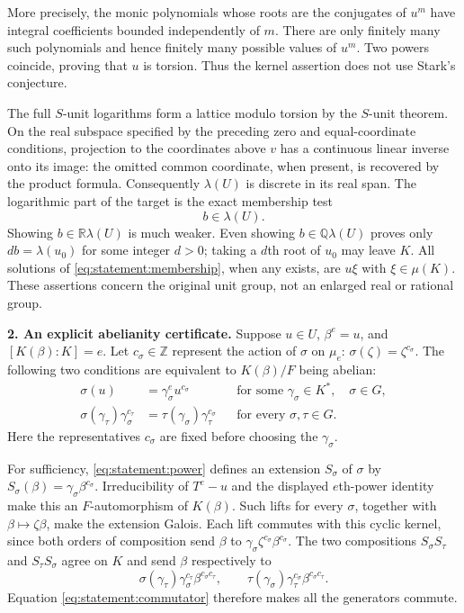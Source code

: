\documentclass[11pt,a4paper]{article}
\newcommand{\Z}{\mathbb{Z}}
\newcommand{\Q}{\mathbb{Q}}
\newcommand{\R}{\mathbb{R}}
\numberwithin{equation}{section}
\begin{document}
More precisely, the monic polynomials whose roots are the conjugates of
$u^m$ have integral coefficients bounded independently of $m$. There are
only finitely many such polynomials and hence finitely many possible
values of $u^m$. Two powers coincide, proving that $u$ is torsion.
Thus the kernel assertion does not use Stark's conjecture.

The full $S$-unit logarithms form a lattice modulo torsion by the
$S$-unit theorem. On the real subspace specified by the preceding zero
and equal-coordinate conditions, projection to the coordinates above
$v$ has a continuous linear inverse onto its image: the omitted common
coordinate, when present, is recovered by the product formula.
Consequently $\lambda(U)$ is discrete in its real span. The logarithmic
part of the target is the exact membership test
\begin{equation}\label{eq:statement:membership}
                         b\in\lambda(U).
\end{equation}
Showing $b\in\R\lambda(U)$ is much weaker. Even showing
$b\in\Q\lambda(U)$ proves only $db=\lambda(u_0)$ for some integer
$d>0$; taking a $d$th root of $u_0$ may leave $K$. All solutions of
\eqref{eq:statement:membership}, when any exists, are $u\xi$ with
$\xi\in\mu(K)$. These assertions concern the original unit group, not
an enlarged real or rational group.

\textbf{2. An explicit abelianity certificate.}
Suppose $u\in U$, $\beta^e=u$, and $[K(\beta):K]=e$. Let
$c_\sigma\in\Z$ represent the action of $\sigma$ on $\mu_e$:
$\sigma(\zeta)=\zeta^{c_\sigma}$. The following two conditions are
equivalent to $K(\beta)/F$ being abelian:
\begin{align}
 \sigma(u)&=\gamma_\sigma^e u^{c_\sigma}
       &&\text{for some }\gamma_\sigma\in K^*,\quad\sigma\in G,
       \label{eq:statement:power}\\
 \sigma(\gamma_\tau)\gamma_\sigma^{c_\tau}
       &=\tau(\gamma_\sigma)\gamma_\tau^{c_\sigma}
       &&\text{for every }\sigma,\tau\in G.
       \label{eq:statement:commutator}
\end{align}
Here the representatives $c_\sigma$ are fixed before choosing the
$\gamma_\sigma$.

For sufficiency, \eqref{eq:statement:power} defines an extension
$S_\sigma$ of $\sigma$ by
$S_\sigma(\beta)=\gamma_\sigma\beta^{c_\sigma}$.
Irreducibility of $T^e-u$ and the displayed $e$th-power identity make
this an $F$-automorphism of $K(\beta)$. Such lifts for every $\sigma$,
together with $\beta\mapsto\zeta\beta$, make the extension Galois.
Each lift commutes with this cyclic kernel, since both orders of
composition send $\beta$ to
$\gamma_\sigma\zeta^{c_\sigma}\beta^{c_\sigma}$.
The two compositions $S_\sigma S_\tau$ and $S_\tau S_\sigma$ agree
on $K$ and send $\beta$ respectively to
\[
 \sigma(\gamma_\tau)\gamma_\sigma^{c_\tau}
       \beta^{c_\sigma c_\tau},\qquad
 \tau(\gamma_\sigma)\gamma_\tau^{c_\sigma}
       \beta^{c_\sigma c_\tau}.
\]
Equation \eqref{eq:statement:commutator} therefore makes all the generators
commute.
\end{document}
